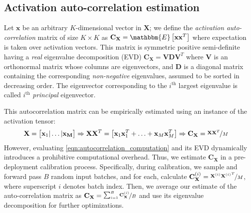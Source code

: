 \documentclass{article}
\theoremstyle{plain}
\begin{document}
\subsection{Activation auto-correlation estimation}
Let $\mathbf{x}$ be an arbitrary $K$-dimensional vector in $\mathbf{X}$; we define the \emph{activation auto-correlation} matrix of size $K\times K$ as $\mathbf{C}_{\mathbf{X}} = \mathbbm{E}\left[\mathbf{x}\mathbf{x}^T\right]$ where expectation is taken over activation vectors. This matrix is symmetric positive semi-definite having a \emph{real} eigenvalue decomposition (EVD) $\mathbf{C}_{\mathbf{X}} = \mathbf{V}\mathbf{D}\mathbf{V}^T$ where $\mathbf{V}$ is an orthonormal matrix whose columns are eigenvectors, and $\mathbf{D}$ is a diagonal matrix containing the corresponding \emph{non-negative} eigenvalues, assumed to be sorted in decreasing order. The eigenvector corresponding to the $i^\text{th}$ largest eigenvalue is called $i^\text{th}$ \emph{principal} eigenvector.


This autocorrelation matrix can be empirically estimated using an instance of the activation tensor:
\begin{align}
    \label{eqn:autocorrelation_computation}
\mathbf{X} = \begin{bmatrix} \mathbf{x}_1 | \ldots | \mathbf{x_M} \end{bmatrix} \Rightarrow \mathbf{X}\mathbf{X}^T = \left[ \mathbf{x}_1 \mathbf{x}_1^T + \ldots + \mathbf{x}_M \mathbf{x}_M^T \right] \Rightarrow \mathbf{C}_{\mathbf{X}} = \nicefrac{\mathbf{X}\mathbf{X}^T}{M} 
\end {align}
However, evaluating  \eqref{eqn:autocorrelation_computation} and its EVD dynamically introduces a prohibitive computational overhead. Thus, we estimate $\mathbf{C}_{\mathbf{X}}$ in a pre-deployment calibration process. Specifically, during calibration, we sample and forward pass $B$ random input batches, and for each, calculate $\mathbf{C}^{(i)}_{\mathbf{X}}=\nicefrac{\mathbf{X}^{(i)}{\mathbf{X}^{(i)}}^T}{M} $, where superscript $i$ denotes batch index. Then, we average our estimate of the auto-correlation matrix as $\mathbf{C}_{\mathbf{X}} = \nicefrac{\sum_{i=1}^B \mathbf{C}^{(i)}_{\mathbf{X}}}{B}$ and use its eigenvalue decomposition for further optimizations.
\end{document}
